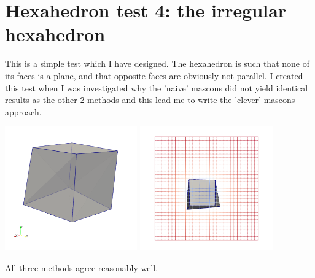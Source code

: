 \section*{Hexahedron test 4: the irregular hexahedron}

This is a simple test which I have designed. The hexahedron is such that 
none of its faces is a plane, and that opposite faces are obviously 
not parallel. I created this test when I was investigated why the 'naive'
mascons did not yield identical results as the other 2 methods and this lead me 
to write the 'clever' mascons approach.

\begin{center}
\includegraphics[width=5.7cm]{python_codes/fieldstone_113/results/hex_test4/myblock_2}
\includegraphics[width=5.7cm]{python_codes/fieldstone_113/results/hex_test4/myblock_1}
\end{center}

All three methods agree reasonably well. 

